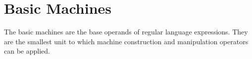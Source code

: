 \documentclass[letterpaper,11pt,oneside]{book}
\begin{document}



\section{Basic Machines}
\label{basic}

The basic machines are the base operands of regular language expressions. They
are the smallest unit to which machine construction and manipulation operators
can be applied.
\end{document}
